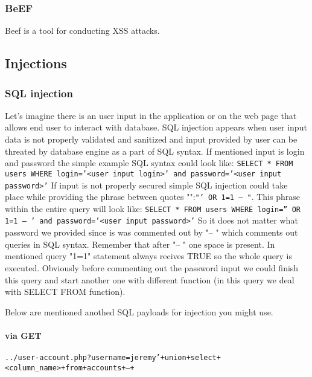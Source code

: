 \documentclass{article}[12pt]
\newcommand{\q}[1]{\texttt{#1}}
\begin{document}
\subsubsection{BeEF} Beef is a tool for conducting XSS attacks.





\subsection{Injections}
\subsubsection{SQL injection}
Let's imagine there is an user input in the application or on the web page that allows end user to interact with database.
SQL injection appears when
user input data is not properly validated and sanitized and input provided by user can be threated by database engine as a part of SQL syntax.
If mentioned input is login and password the simple example SQL syntax could look like:
\newline
\texttt{SELECT * FROM users WHERE login='<user input login>' and password='<user input password>'}
\newline
If input is not properly secured simple SQL injection could take place while providing the phrase between quotes "":\texttt{"' OR 1=1 -- "}.
This phrase within the entire query will look like:
\newline
\texttt{SELECT * FROM users WHERE login='' OR 1=1 -- ' and password='<user input password>'}
So it does not matter what password we provided since is was commented out by "-- " which comments out queries in SQL syntax.
Remember that after "-- " one space is present.
In mentioned query "1=1" statement always recives TRUE so the whole query is executed.
Obviously before commenting out the password input we could finish this query and start another one with different function (in this query we deal with SELECT FROM function).

Below are mentioned anothed SQL payloads for injection you might use.
\paragraph{via GET} \q{../user-account.php?username=jeremy'+union+select+<column\_name>+from+accounts+--+}
\end{document}
